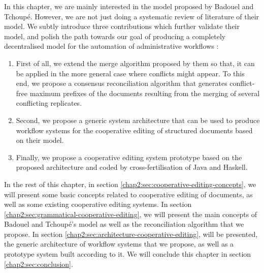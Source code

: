 In this chapter, we are mainly interested in the model proposed by Badouel and Tchoup\'e. However, we are not just doing a systematic review of literature of their model. We subtly introduce three contributions which further validate their model, and polish the path towards our goal of producing a completely decentralised model for the automation of administrative workflows :
\begin{enumerate}
	\item First of all, we extend the merge algorithm proposed by them so that, it can be applied in the more general case where conflicts might appear. To this end, we propose a consensus reconciliation algorithm that generates conflict-free maximum prefixes of the documents resulting from the merging of several conflicting replicates.
	\item Second, we propose a generic system architecture that can be used to produce workflow systems for the cooperative editing of structured documents based on their model.
	\item Finally, we propose a cooperative editing system prototype based on the proposed architecture and coded by cross-fertilisation of Java and Haskell.
\end{enumerate}

In the rest of this chapter, in section \ref{chap2:sec:cooperative-editing-concepts}, we will present some basic concepts related to cooperative editing of documents, as well as some existing cooperative editing systems. In section \ref{chap2:sec:grammatical-cooperative-editing}, we will present the main concepts of Badouel and Tchoup\'e's model as well as the reconciliation algorithm that we propose. In section \ref{chap2:sec:architecture-cooperative-editing}, will be presented, the generic architecture of workflow systems that we propose, as well as a prototype system built according to it. We will conclude this chapter in section \ref{chap2:sec:conclusion}.
